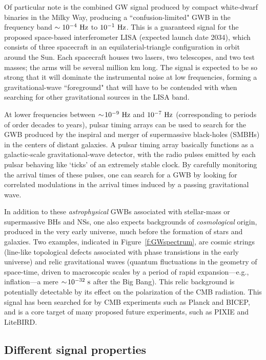 Of particular note is the combined GW 
signal produced by compact white-dwarf binaries in 
the Milky Way, producing a ``confusion-limited" GWB
in the frequency band $\sim 10^{-4}~{\rm Hz}$ to 
$10^{-1}~{\rm Hz}$.
This is a guaranteed signal for the proposed 
space-based interferometer LISA (expected launch date 2034), 
which consists of three spacecraft in an 
equilaterial-triangle configuration 
in orbit around the Sun.
Each spacecraft houses two lasers, two telescopes, and 
two test masses; 
the arms will be several million km long.
The signal is expected to be so strong that it will
dominate the instrumental noise at low frequencies, 
forming a gravitational-wave ``foreground" that will
have to be contended with when searching for other 
gravitational sources in the LISA band.

At lower frequencies between 
$\sim\!10^{-9}~{\rm Hz}$ and $10^{-7}~{\rm Hz}$
(corresponding to periods of order decades to years), 
pulsar timing arrays can be used to 
search for the GWB produced by the inspiral and merger 
of supermassive black-holes (SMBHs) in the centers of
distant galaxies.
A pulsar timing array basically functions as a 
galactic-scale gravitational-wave detector, with the
radio pulses emitted by each pulsar behaving like 
`ticks' of an extremely stable clock.
By carefully monitoring the arrival times of these
pulses, one can search for a GWB by looking for 
correlated modulations in the arrival times 
induced by a passing gravitational wave.

In addition to these {\em astrophysical} GWBs 
associated with stellar-mass or supermassive BHs 
and NSs, one also expects backgrounds of 
{\em cosmological} origin, produced in the 
very early universe, much before the formation of 
stars and galaxies.  
Two examples, indicated in Figure~\ref{f:GWspectrum}, 
are cosmic strings (line-like topological defects 
associated with 
phase transistions in the early universe) and
relic gravitational waves (quantum 
fluctuations in the geometry of space-time, 
driven to macroscopic scales by a period of rapid 
expansion---e.g., inflation---a mere 
$\sim\!10^{-32}~{\rm s}$ after the Big Bang).
This relic background is potentially detectable 
by its effect on the polarization of the CMB radiation.
This signal has been searched for by CMB experiments
such as Planck and BICEP, and is a core target of many
proposed future experiments, such as PIXIE and LiteBIRD.

\subsection{Different signal properties}
\label{s:different_signal_properties}

